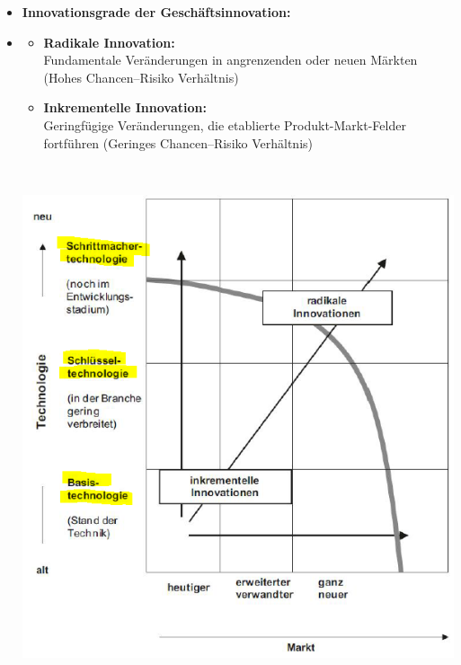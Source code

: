 \documentclass[12pt,a4paper]{article}
\begin{document}
\begin{itemize}
   \item \textbf{Innovationsgrade der Geschäftsinnovation:} \vspace*{-0.5cm}
   \item[] \begin{minipage}[t]{0.35\textwidth} \vspace*{0cm}
               \begin{itemize}
		            \item \textbf{Radikale Innovation:}\\
		                  Fundamentale Veränderungen in angrenzenden oder neuen Märkten (Hohes Chancen–Risiko Verhältnis)
		            \item \textbf{Inkrementelle Innovation:}\\
		                  Geringfügige Veränderungen, die etablierte Produkt-Markt-Felder fortführen (Geringes Chancen–Risiko Verhältnis)
		         \end{itemize}
            \end{minipage} \begin{minipage}[t]{0.05\textwidth} \vspace*{0cm}
               $\ $ \\
            \end{minipage} \begin{minipage}[t]{0.5\textwidth} \vspace*{0cm}
               \includegraphics[scale=0.55]{InnovationsgradeH.png}
            \end{minipage}
   

\end{itemize}
\end{document}

